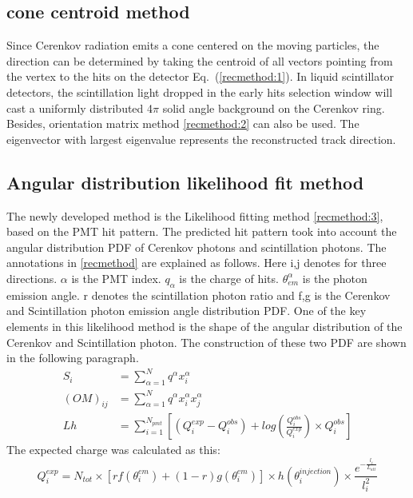 \documentclass[a4paper,10pt]{cpc-hepnp}
\begin{document}
\subsection{cone centroid method}
Since Cerenkov radiation emits a cone centered on the moving particles, the
direction can be determined by taking the centroid of all vectors pointing 
from  the vertex to the hits on the detector Eq.~(\eqref{recmethod:1}). 
In liquid scintillator detectors, the
scintillation light dropped in the early hits selection window will cast a
uniformly distributed 4$\pi$ solid angle background on the Cerenkov ring.
Besides, orientation matrix method \eqref{recmethod:2} can also be used.
The eigenvector with largest eigenvalue represents the reconstructed track direction. 

\subsection{Angular distribution likelihood fit method}
The newly developed method is the Likelihood fitting
method \eqref{recmethod:3}, based on the PMT hit pattern. The predicted hit
pattern took into account the angular distribution PDF of Cerenkov
photons and scintillation photons. The annotations in \eqref{recmethod} are
explained as follows.
Here i,j denotes for three directions. $\alpha$ is the PMT index. $q_{\alpha}$ is the
charge of hits. $\theta_{em}^{\alpha}$  is the photon emission angle. r denotes
the scintillation photon ratio and f,g is the Cerenkov and Scintillation photon
emission angle distribution PDF. 
One of the key elements in this
likelihood method is the shape of the angular distribution of the Cerenkov
and Scintillation photon. The construction of these two PDF are shown in the
following paragraph.
\begin{subequations}\label{recmethod}
\begin{align}
\label{recmethod:1}
S_{i} & = \sum_{\alpha=1}^{N}q^{\alpha}x_{i}^{\alpha}
\\
\label{recmethod:2}
(OM)_{ij} & = \sum_{\alpha=1}^{N}q^{\alpha}x_{i}^{\alpha}x_{j}^{\alpha}
\\
\label{recmethod:3}
Lh &= \sum_{i=1}^{N_{pmt}}[(Q^{exp}_{i}-Q^{obs}_{i})+log(\frac{Q^{obs}_{i}}{Q^{exp}_{i}}){\times}Q^{obs}_{i}]
\end{align}
\end{subequations}
The expected charge was calculated as this:
\begin{equation*}
Q^{exp}_{i} = N_{tot}\times[rf(\theta^{em}_{i})+(1-r)g(\theta^{em}_{i})]{\times}h(\theta^{injection}_{i})\times\frac{e^{-\frac{l_i}{L_{att}}}}{l_i^2}
\end{equation*}
\end{document}
